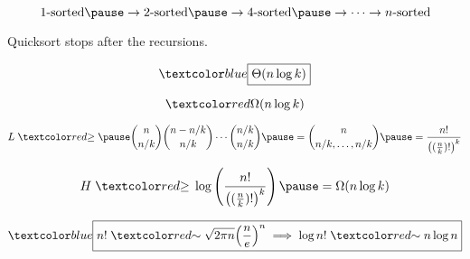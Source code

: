 \begin{frame}{}
  \begin{center}
	{}
  \end{center}

  \pause
  \[
    1\text{-sorted} \pause \to 2\text{-sorted} \pause \to 4\text{-sorted} \pause \to \cdots \to n\text{-sorted}
  \]

  \pause
  \centerline{Quicksort  stops after the  recursions.}

  \pause
  \vspace{0.50cm}
  \[
    \blue{\boxed{\Theta(n \log k)}}
  \]
\end{frame}

\begin{frame}{}
  \[
    \red{\Omega(n \log k)}
  \]

  \pause
  \[
	L \;\red{\ge}\; \pause \binom{n}{n/k} \binom{n-n/k}{n/k} \cdots \binom{n/k}{n/k}
	\pause = \binom{n}{n/k, \ldots, n/k} \pause = \frac{n!}{\left( (\frac{n}{k})! \right)^{k}}
  \]

  \pause
  \[
	H \;\red{\ge}\; \log \left(\frac{n!}{\left( (\frac{n}{k})! \right)^{k}} \right) \pause = \Omega(n \log k)
  \]

  \pause
  \vspace{0.30cm}
  \[
	\blue{\boxed{n! \;\red{\sim}\; \sqrt{2 \pi n} \Big(\frac{n}{e}\Big)^{n} \implies \log n! \;\red{\sim}\; n \log n}}
  \]
\end{frame}

% 
% 
% 

